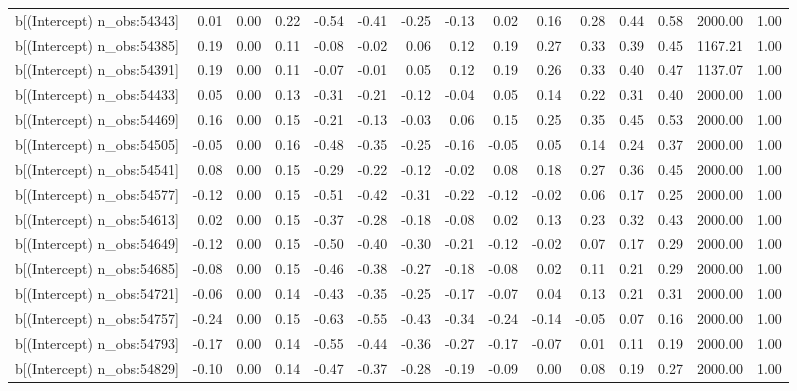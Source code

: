 \begin{table}[ht]
\begin{tabular}{rrrrrrrrrrrrrrr}
  b[(Intercept) n\_obs:54343] & 0.01 & 0.00 & 0.22 & -0.54 & -0.41 & -0.25 & -0.13 & 0.02 & 0.16 & 0.28 & 0.44 & 0.58 & 2000.00 & 1.00 \\ 
  b[(Intercept) n\_obs:54385] & 0.19 & 0.00 & 0.11 & -0.08 & -0.02 & 0.06 & 0.12 & 0.19 & 0.27 & 0.33 & 0.39 & 0.45 & 1167.21 & 1.00 \\ 
  b[(Intercept) n\_obs:54391] & 0.19 & 0.00 & 0.11 & -0.07 & -0.01 & 0.05 & 0.12 & 0.19 & 0.26 & 0.33 & 0.40 & 0.47 & 1137.07 & 1.00 \\ 
  b[(Intercept) n\_obs:54433] & 0.05 & 0.00 & 0.13 & -0.31 & -0.21 & -0.12 & -0.04 & 0.05 & 0.14 & 0.22 & 0.31 & 0.40 & 2000.00 & 1.00 \\ 
  b[(Intercept) n\_obs:54469] & 0.16 & 0.00 & 0.15 & -0.21 & -0.13 & -0.03 & 0.06 & 0.15 & 0.25 & 0.35 & 0.45 & 0.53 & 2000.00 & 1.00 \\ 
  b[(Intercept) n\_obs:54505] & -0.05 & 0.00 & 0.16 & -0.48 & -0.35 & -0.25 & -0.16 & -0.05 & 0.05 & 0.14 & 0.24 & 0.37 & 2000.00 & 1.00 \\ 
  b[(Intercept) n\_obs:54541] & 0.08 & 0.00 & 0.15 & -0.29 & -0.22 & -0.12 & -0.02 & 0.08 & 0.18 & 0.27 & 0.36 & 0.45 & 2000.00 & 1.00 \\ 
  b[(Intercept) n\_obs:54577] & -0.12 & 0.00 & 0.15 & -0.51 & -0.42 & -0.31 & -0.22 & -0.12 & -0.02 & 0.06 & 0.17 & 0.25 & 2000.00 & 1.00 \\ 
  b[(Intercept) n\_obs:54613] & 0.02 & 0.00 & 0.15 & -0.37 & -0.28 & -0.18 & -0.08 & 0.02 & 0.13 & 0.23 & 0.32 & 0.43 & 2000.00 & 1.00 \\ 
  b[(Intercept) n\_obs:54649] & -0.12 & 0.00 & 0.15 & -0.50 & -0.40 & -0.30 & -0.21 & -0.12 & -0.02 & 0.07 & 0.17 & 0.29 & 2000.00 & 1.00 \\ 
  b[(Intercept) n\_obs:54685] & -0.08 & 0.00 & 0.15 & -0.46 & -0.38 & -0.27 & -0.18 & -0.08 & 0.02 & 0.11 & 0.21 & 0.29 & 2000.00 & 1.00 \\ 
  b[(Intercept) n\_obs:54721] & -0.06 & 0.00 & 0.14 & -0.43 & -0.35 & -0.25 & -0.17 & -0.07 & 0.04 & 0.13 & 0.21 & 0.31 & 2000.00 & 1.00 \\ 
  b[(Intercept) n\_obs:54757] & -0.24 & 0.00 & 0.15 & -0.63 & -0.55 & -0.43 & -0.34 & -0.24 & -0.14 & -0.05 & 0.07 & 0.16 & 2000.00 & 1.00 \\ 
  b[(Intercept) n\_obs:54793] & -0.17 & 0.00 & 0.14 & -0.55 & -0.44 & -0.36 & -0.27 & -0.17 & -0.07 & 0.01 & 0.11 & 0.19 & 2000.00 & 1.00 \\ 
  b[(Intercept) n\_obs:54829] & -0.10 & 0.00 & 0.14 & -0.47 & -0.37 & -0.28 & -0.19 & -0.09 & 0.00 & 0.08 & 0.19 & 0.27 & 2000.00 & 1.00 \\ 

\end{tabular}
\end{table}
